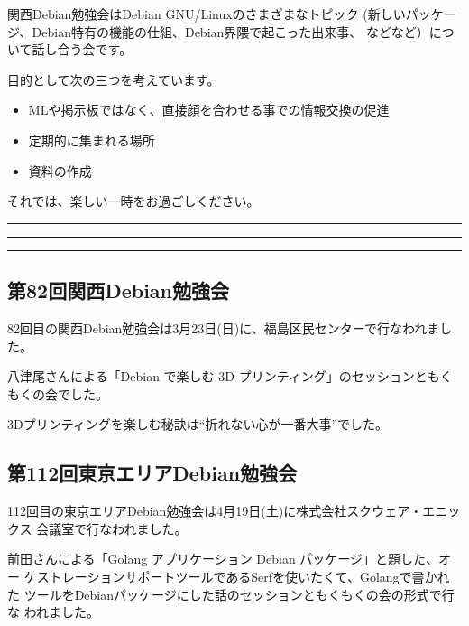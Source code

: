 \documentclass[mingoth,a4paper]{jsarticle}
\begin{document}
 関西Debian勉強会はDebian GNU/Linuxのさまざまなトピック
 (新しいパッケージ、Debian特有の機能の仕組、Debian界隈で起こった出来事、
 などなど）について話し合う会です。

 目的として次の三つを考えています。
 \begin{itemize}
  \item MLや掲示板ではなく、直接顔を合わせる事での情報交換の促進
  \item 定期的に集まれる場所
  \item 資料の作成
 \end{itemize}

 それでは、楽しい一時をお過ごしください。

\newpage

\begin{minipage}[b]{0.2\hsize}
 {}
\end{minipage}
\begin{minipage}[b]{0.8\hsize}
\hrule
\vspace{2mm}
\hrule
\setcounter{tocdepth}{1}
\tableofcontents
\vspace{2mm}
\hrule
\end{minipage}


\subsection{第82回関西Debian勉強会}

82回目の関西Debian勉強会は3月23日(日)に、福島区民センターで行なわれまし
た。

八津尾さんによる「Debian で楽しむ 3D プリンティング」のセッションともく
もくの会でした。

3Dプリンティングを楽しむ秘訣は``折れない心が一番大事''でした。


\subsection{第112回東京エリアDebian勉強会}

112回目の東京エリアDebian勉強会は4月19日(土)に株式会社スクウェア・エニッ
クス 会議室で行なわれました。

前田さんによる「Golang アプリケーション Debian パッケージ」と題した、オー
ケストレーションサポートツールであるSerfを使いたくて、Golangで書かれた
ツールをDebianパッケージにした話のセッションともくもくの会の形式で行な
われました。
\end{document}
